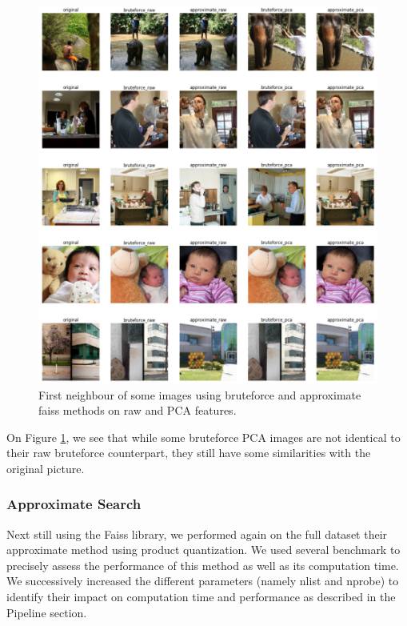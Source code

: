 \documentclass[a4paper]{article}
\begin{document}
\begin{figure}[h]
	\includegraphics[width=\textwidth]{visual-faiss}
	\caption{First neighbour of some images using bruteforce and approximate faiss methods on raw and PCA features.}
	\label{fig:visual-faiss}
\end{figure}

On Figure \ref{fig:visual-faiss}, we see that while some bruteforce PCA images are not identical to their raw bruteforce counterpart, they still have some similarities with the original picture. 

\subsubsection{Approximate Search}

Next still using the Faiss library, we performed again on the full dataset their approximate method using product quantization. We used several benchmark to precisely assess the performance of this method as well as its computation time. We successively increased the different parameters (namely nlist and nprobe) to identify their impact on computation time and performance as described in the Pipeline section.
\end{document}
